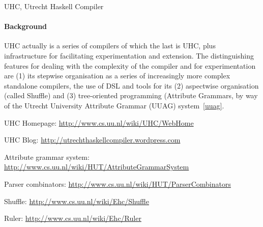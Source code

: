 \begin{hcarentry}{UHC, Utrecht Haskell Compiler}
\paragraph{Background}

UHC actually is a series of compilers of which the last is UHC, plus
infrastructure for facilitating experimentation and extension.
The distinguishing features for dealing with the complexity of the compiler and for experimentation are
(1) its stepwise organisation as a series of increasingly more complex standalone compilers,
the use of DSL and tools for its (2) aspectwise organisation (called Shuffle) and
(3) tree-oriented programming (Attribute Grammars, by way of the
Utrecht University Attribute Grammar (UUAG) system~\cref{uuag}.
%

\FurtherReading
\begin{compactitem}
\item UHC Homepage:
\url{http://www.cs.uu.nl/wiki/UHC/WebHome}

\item UHC Blog:
\url{http://utrechthaskellcompiler.wordpress.com}

\item Attribute grammar system:
\url{http://www.cs.uu.nl/wiki/HUT/AttributeGrammarSystem}

\item Parser combinators:
\url{http://www.cs.uu.nl/wiki/HUT/ParserCombinators}

\item Shuffle:
\url{http://www.cs.uu.nl/wiki/Ehc/Shuffle}

\item Ruler:
\url{http://www.cs.uu.nl/wiki/Ehc/Ruler}
\end{compactitem}
\end{hcarentry}
